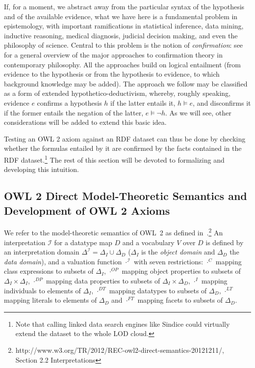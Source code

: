 \documentclass[review]{elsarticle}
\theoremstyle{definition}
\begin{document}
If, for a moment, we abstract away from the particular syntax of the hypothesis
and of the available evidence, what we have here is a fundamental problem in
epistemology, with important ramifications in statistical inference,
data mining, inductive reasoning, medical diagnosis,
judicial decision making, and even the philosophy of science.
Central to this problem is the notion of \emph{confirmation}:
see \cite{Crupi2016} for a general overview of the major approaches to
confirmation theory in contemporary philosophy.
All the approaches build on logical entailment (from evidence to the hypothesis
or from the hypothesis to evidence, to which background knowledge may be added).
The approach we follow may be classified as a form of extended
hypothetico-deductivism, whereby, roughly speaking, evidence $e$ confirms
a hypothesis $h$ if the latter entails it, $h \models e$, and disconfirms it
if the former entails the negation of the latter, $e \models \neg h$.
As we will see, other considerations will be added to extend this basic idea.

Testing an OWL 2 axiom against an RDF dataset can thus be done by checking
whether the formulas entailed by it are confirmed by the facts
contained in the RDF dataset.\footnote{Note that calling linked data search engines
like Sindice could virtually extend the dataset to the whole LOD cloud.}
The rest of this section will be devoted to formalizing and developing
this intuition.

\subsection{OWL 2 Direct Model-Theoretic Semantics and Development of OWL 2 Axioms}
We refer to the model-theoretic semantics of OWL~2 as defined in~\cite{OWL2-direct-semantics}.\footnote{http://www.w3.org/TR/2012/REC-owl2-direct-semantics-20121211/, \\Section 2.2 Interpretations}
An interpretation $\mathcal{I}$ for a datatype map $D$ and a vocabulary $V$ over $D$ is defined by an interpretation domain $\Delta^\mathcal{I}=\Delta_{I}\cup\Delta_{D}$  ($\Delta_{I}$ is the \textit{object domain} and $\Delta_{D}$ the \textit{data domain}), and a valuation function $\cdot^{\mathcal{I}}$ with seven restrictions: $\cdot^{C}$ mapping class expressions to subsets of $\Delta_{I}$,  $\cdot^{OP}$ mapping object properties to subsets of $\Delta_{I}\times\Delta_{I}$, $\cdot^{DP}$ mapping data properties to subsets of $\Delta_{I}\times\Delta_{D}$, $\cdot^{I}$ mapping individuals to elements of $\Delta_{I}$, $\cdot^{DT}$ mapping datatypes to subsets of $\Delta_{D}$, $\cdot^{LT}$ mapping literals to elements of $\Delta_{D}$ and $\cdot^{FT}$ mapping facets to subsets of $\Delta_{D}$.
\end{document}
